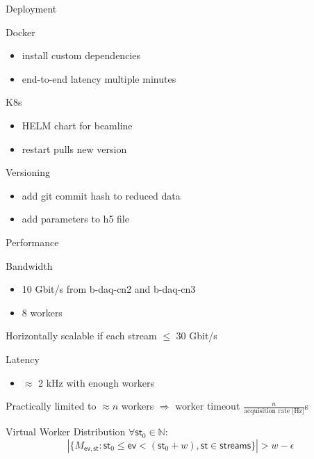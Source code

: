 \documentclass[aspectratio=169]{beamer}
\begin{document}
\begin{frame}{Deployment}
 \begin{block}{Docker}
  \begin{itemize}
   \item install custom dependencies
   \item end-to-end latency multiple minutes
  \end{itemize}
 \end{block}
 
 \begin{block}{K8s}
  \begin{itemize}
   \item HELM chart for beamline
   \item restart pulls new version
  \end{itemize}
 \end{block}
    
\begin{block}{Versioning}
 \begin{itemize}
  \item add git commit hash to reduced data
  \item add parameters to h5 file
 \end{itemize}

\end{block}

\end{frame}

\begin{frame}{Performance}
 \begin{block}{Bandwidth}
  \begin{itemize}
   \item 10 Gbit/s from b-daq-cn2 and b-daq-cn3
   \item 8 workers
  \end{itemize}
 Horizontally scalable if each stream $\leq$ 30 Gbit/s
 \end{block}
 
 \begin{block}{Latency}
  \begin{itemize}
   \item $\approx$ 2 kHz with enough workers
  \end{itemize}
  Practically limited to $\approx n$  workers $\Rightarrow$ worker timeout $\frac{n}{\text{acquisition rate [Hz]}}$s 
 \end{block}
    \newcommand{\ev}{\mathsf{ev}}
    \newcommand{\st}{\mathsf{st}}
  \begin{block}{Virtual Worker Distribution}
  $\forall \st_0\in\mathbb{N}:$
   \[|\{M_{\ev,\st} : \st_0\leq\ev<(\st_0+w), \st\in\mathsf{streams}\}| > w-\epsilon \]
  \end{block}


\end{frame}
\end{document}
